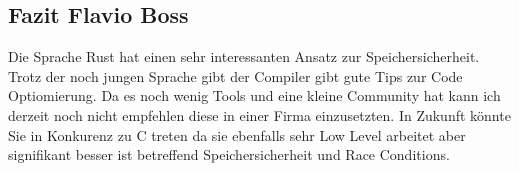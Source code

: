 \subsection{Fazit Flavio Boss}
Die Sprache Rust hat einen sehr interessanten Ansatz zur Speichersicherheit. Trotz der noch jungen Sprache gibt der Compiler gibt gute Tips zur Code Optiomierung. Da es noch wenig Tools und eine kleine Community hat kann ich derzeit noch nicht empfehlen diese in einer Firma einzusetzten. In Zukunft könnte Sie in Konkurenz zu C treten da sie ebenfalls sehr Low Level arbeitet aber signifikant besser ist betreffend Speichersicherheit und Race Conditions.